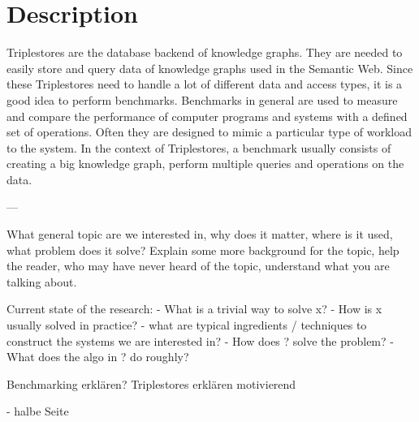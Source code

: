 \chapter{Description}
\label{ch:description}

Triplestores are the database backend of knowledge graphs. 
They are needed to easily store and query data of knowledge graphs used in the Semantic Web.
Since these Triplestores need to handle a lot of different data and access types, it is a good idea to perform benchmarks.
Benchmarks in general are used to measure and compare the performance of computer programs and systems with a defined set of operations.
Often they are designed to mimic a particular type of workload to the system.
In the context of Triplestores, a benchmark usually consists of creating a big knowledge graph, perform multiple queries and operations on the data.



---

What general topic are we interested in, why does it matter, where is it used, what problem does it solve?
Explain some more background for the topic, help the reader, who may have never heard of the topic, understand what you are talking about.

Current state of the research:
- What is a trivial way to solve x?
- How is x usually solved in practice?
- what are typical ingredients / techniques to construct the systems we are interested in?
- How does ? solve the problem?
- What does the algo in ? do roughly?


Benchmarking erklären?
Triplestores erklären motivierend


- halbe Seite

